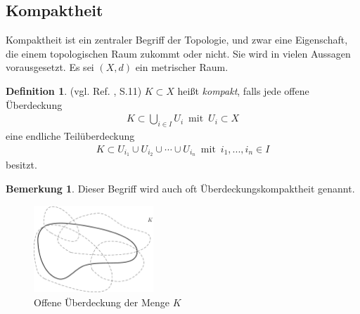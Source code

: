\documentclass[10pt,a4paper]{article}
\theoremstyle{plain}
\theoremstyle{definition}
\newtheorem{definition}[satz]{Definition}
\newenvironment{dfi}{\begin{shaded}\begin{definition}}{\end{definition}\end{shaded}}
\theoremstyle{nonumberplain}
\newtheorem{bemerkung}{Bemerkung}
\newenvironment{bem}{\begin{bemerkung}}{\end{bemerkung}}
\begin{document}
\subsection{Kompaktheit}
Kompaktheit ist ein zentraler Begriff der Topologie, und zwar eine Eigenschaft, die einem topologischen Raum zukommt oder nicht. Sie wird in vielen Aussagen vorausgesetzt. Es sei $(X,d)$ ein metrischer Raum.
\begin{dfi}
\label{überdeckungskompakt}
(vgl. Ref. \cite{Clason}, S.11) $K \subset X$ heißt \textit{kompakt}, falls jede offene Überdeckung 
\begin{align*}
K \subset \bigcup_{i \in I}{U_i} \enspace \text{mit} \enspace U_i \subset X
\end{align*}
eine endliche Teilüberdeckung
\begin{align*}
K \subset U_{i_1} \cup  U_{i_2} \cup \cdots \cup U_{i_n}  \enspace \text{mit} \enspace i_1, ..., i_n \in I
\end{align*}
besitzt.
\end{dfi}
\begin{bem}
Dieser Begriff wird auch oft Überdeckungskompaktheit genannt.
\end{bem}
\begin{figure}[h]
\centering
\includegraphics[width=0.4\textwidth]{pictures/ueberdeckung}
\caption{Offene Überdeckung der Menge $K$ \cite{Überdeckung}}
\end{figure}
\end{document}
